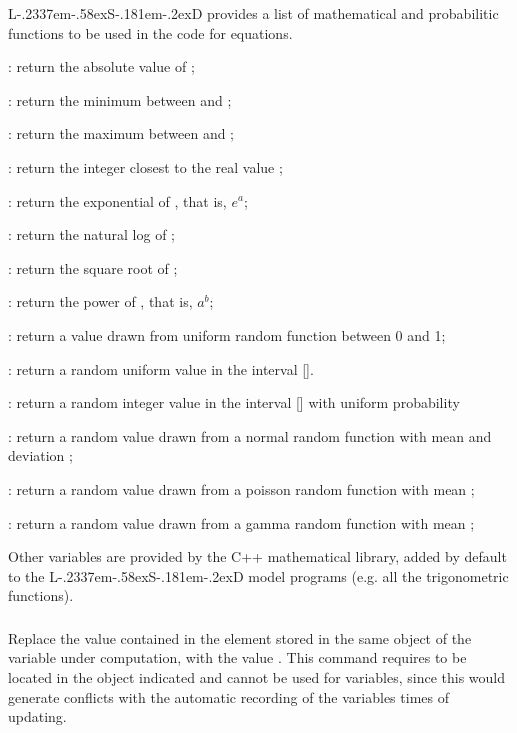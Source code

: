 \documentclass [11pt,a4paper] {book}
\def\LsD{{L\kern-.2337em\lower-.58ex\hbox{S}\kern-.181em\lower-.2ex\hbox{D}}\xspace}
\begin{document}
\LsD provides a list of mathematical and probabilitic functions to be used in the code for equations. 

\begin{list}{- }{\itemsep -0.2cm}

\item {}: return the absolute value of ;
\item {}: return the minimum between  and ;
\item {}: return the maximum between  and ;
\item {}: return the integer closest to the real value ;
\item {}: return the exponential of , that is, $e^a$;
\item {}: return the natural log of ;
\item {}: return the square root of ;
\item {}: return the power  of , that is, $a^b$;
\item {}: return a value drawn from uniform random function between 0 and 1;
\item {}: return a random uniform value in the interval [].
\item {}: return a random integer value in the interval [] with uniform probability
\item {}: return a random value drawn from a normal random function with mean  and deviation ;
\item {}: return a random value drawn from a poisson random function with mean ;
\item {}: return a random value drawn from a gamma random function with mean ;
\end{list}

Other variables are provided by the C++ mathematical library, added by default to the \LsD model programs (e.g. all the trigonometric functions). 

\subsubsection{ }
Replace the value contained in the element  stored in the same object of the variable under computation, with the value . This command requires  to be located in the object indicated and cannot be used for variables, since this would generate conflicts with the automatic recording of the variables times of updating.
\end{document}
